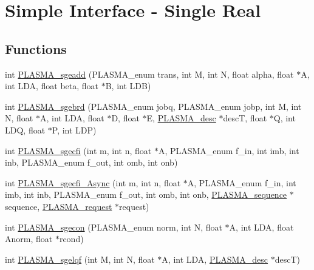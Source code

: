 \hypertarget{group__float}{}\section{Simple Interface -\/ Single Real}
\label{group__float}
\subsection*{Functions}
\begin{DoxyCompactItemize}
\item 
int \hyperlink{group__float_ga32d664987f7932446c6a1a039e314fc8_ga32d664987f7932446c6a1a039e314fc8}{P\+L\+A\+S\+M\+A\+\_\+sgeadd} (P\+L\+A\+S\+M\+A\+\_\+enum trans, int M, int N, float alpha, float $\ast$A, int L\+D\+A, float beta, float $\ast$B, int L\+D\+B)
\item 
int \hyperlink{group__float_ga5a8eb1ec5b7f9a24c45ad5250100c4d5_ga5a8eb1ec5b7f9a24c45ad5250100c4d5}{P\+L\+A\+S\+M\+A\+\_\+sgebrd} (P\+L\+A\+S\+M\+A\+\_\+enum jobq, P\+L\+A\+S\+M\+A\+\_\+enum jobp, int M, int N, float $\ast$A, int L\+D\+A, float $\ast$D, float $\ast$E, \hyperlink{structplasma__desc__t}{P\+L\+A\+S\+M\+A\+\_\+desc} $\ast$desc\+T, float $\ast$Q, int L\+D\+Q, float $\ast$P, int L\+D\+P)
\item 
int \hyperlink{group__float_gacf47b4a9669e8566884a9f25a6b9a6b5_gacf47b4a9669e8566884a9f25a6b9a6b5}{P\+L\+A\+S\+M\+A\+\_\+sgecfi} (int m, int n, float $\ast$A, P\+L\+A\+S\+M\+A\+\_\+enum f\+\_\+in, int imb, int inb, P\+L\+A\+S\+M\+A\+\_\+enum f\+\_\+out, int omb, int onb)
\item 
int \hyperlink{group__float_ga13c9384aa848ed668f4964fee57fccc3_ga13c9384aa848ed668f4964fee57fccc3}{P\+L\+A\+S\+M\+A\+\_\+sgecfi\+\_\+\+Async} (int m, int n, float $\ast$A, P\+L\+A\+S\+M\+A\+\_\+enum f\+\_\+in, int imb, int inb, P\+L\+A\+S\+M\+A\+\_\+enum f\+\_\+out, int omb, int onb, \hyperlink{structplasma__sequence__t}{P\+L\+A\+S\+M\+A\+\_\+sequence} $\ast$sequence, \hyperlink{structplasma__request__t}{P\+L\+A\+S\+M\+A\+\_\+request} $\ast$request)
\item 
int \hyperlink{group__float_ga23012d51cf74d10f924e8dad2d56ba52_ga23012d51cf74d10f924e8dad2d56ba52}{P\+L\+A\+S\+M\+A\+\_\+sgecon} (P\+L\+A\+S\+M\+A\+\_\+enum norm, int N, float $\ast$A, int L\+D\+A, float Anorm, float $\ast$rcond)
\item 
int \hyperlink{group__float_gaecbccf81ab27bc4a0a5913baedf3b7ef_gaecbccf81ab27bc4a0a5913baedf3b7ef}{P\+L\+A\+S\+M\+A\+\_\+sgelqf} (int M, int N, float $\ast$A, int L\+D\+A, \hyperlink{structplasma__desc__t}{P\+L\+A\+S\+M\+A\+\_\+desc} $\ast$desc\+T)

\end{DoxyCompactItemize}
